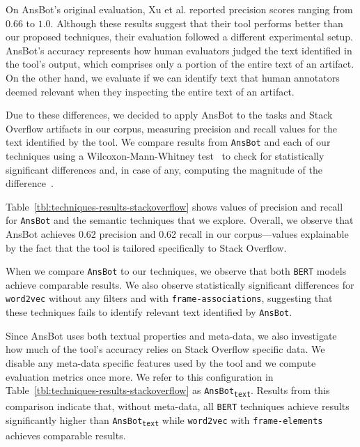 On \acs{AnsBot}'s original evaluation, Xu et al. reported precision scores ranging from $0.66$ to $1.0$. 
Although these results suggest that their tool performs better than our proposed techniques, their evaluation followed a different experimental setup. 
\acs{AnsBot}'s accuracy represents how 
 human evaluators judged the text identified in the tool's output, which comprises only a portion of the entire text of an artifact. On the other hand, 
we evaluate if we can identify text that human annotators deemed relevant when they inspecting the entire text of an artifact.



Due to these differences, we decided to apply \acs{AnsBot} to the tasks and Stack Overflow artifacts in our corpus, measuring precision and recall values for the text identified by the tool. 
We compare results from \texttt{AnsBot} and each of our techniques using
a Wilcoxon-Mann-Whitney test~\cite{mannWhitneyU} to check for statistically significant differences
and, in case of any, computing the magnitude of the difference~\cite{cohen2013statistical}. 



Table~\ref{tbl:techniques-results-stackoverflow} shows values of precision and recall for  \texttt{AnsBot} and the semantic techniques that we explore. 
Overall, we observe that \acs{AnsBot} achieves 0.62 precision and 0.62 recall in our corpus---values explainable by the fact that the tool is tailored specifically to Stack Overflow.


When we compare \texttt{AnsBot} to our techniques, we observe that 
both \texttt{BERT} models achieve comparable results.
We also observe statistically significant differences for 
\texttt{word2vec} without any filters and with \texttt{frame-associations}, suggesting that these techniques
fails to identify relevant text identified by \texttt{AnsBot}.






Since \acs{AnsBot} uses both textual properties and meta-data, 
we also investigate how much of the tool's accuracy relies on Stack Overflow specific data.
We disable any meta-data specific features used by the tool and we compute evaluation metrics once more.
We refer to this configuration in Table~\ref{tbl:techniques-results-stackoverflow} as \texttt{AnsBot\textsubscript{text}}.
Results from this comparison indicate that, without meta-data, all \texttt{BERT} techniques
achieve results 
significantly higher than  \texttt{AnsBot\textsubscript{text}}
while \texttt{word2vec} with \texttt{frame-elements} achieves comparable results.




